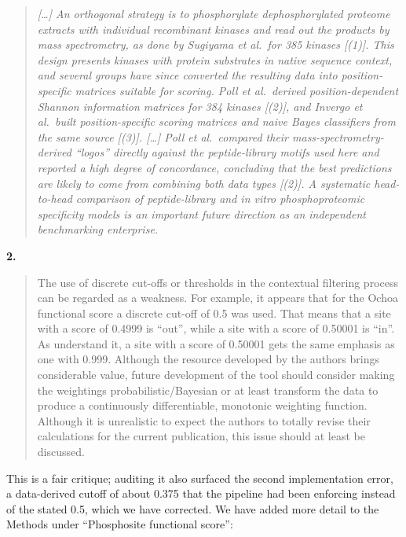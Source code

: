 \documentclass[
]{article}
\begin{document}
\begin{quote}
\emph{{[}\ldots{]} An orthogonal strategy is to phosphorylate
dephosphorylated proteome extracts with individual recombinant kinases
and read out the products by mass spectrometry, as done by Sugiyama et
al.~for 385 kinases {[}(1){]}. This design presents kinases with protein
substrates in native sequence context, and several groups have since
converted the resulting data into position-specific matrices suitable
for scoring. Poll et al.~derived position-dependent Shannon information
matrices for 384 kinases {[}(2){]}, and Invergo et al.~built
position-specific scoring matrices and naive Bayes classifiers from the
same source {[}(3){]}. {[}\ldots{]} Poll et al.~compared their
mass-spectrometry-derived ``logos'' directly against the peptide-library
motifs used here and reported a high degree of concordance, concluding
that the best predictions are likely to come from combining both data
types {[}(2){]}. A systematic head-to-head comparison of peptide-library
and in vitro phosphoproteomic specificity models is an important future
direction as an independent benchmarking enterprise.}
\end{quote}

\textbf{2.}

\begin{quote}
The use of discrete cut-offs or thresholds in the contextual filtering
process can be regarded as a weakness. For example, it appears that for
the Ochoa functional score a discrete cut-off of 0.5 was used. That
means that a site with a score of 0.4999 is ``out'', while a site with a
score of 0.50001 is ``in''. As understand it, a site with a score of
0.50001 gets the same emphasis as one with 0.999. Although the resource
developed by the authors brings considerable value, future development
of the tool should consider making the weightings probabilistic/Bayesian
or at least transform the data to produce a continuously differentiable,
monotonic weighting function. Although it is unrealistic to expect the
authors to totally revise their calculations for the current
publication, this issue should at least be discussed.
\end{quote}

This is a fair critique; auditing it also surfaced the second
implementation error, a data-derived cutoff of about 0.375 that the
pipeline had been enforcing instead of the stated 0.5, which we have
corrected. We have added more detail to the Methods under ``Phosphosite
functional score'':
\end{document}
